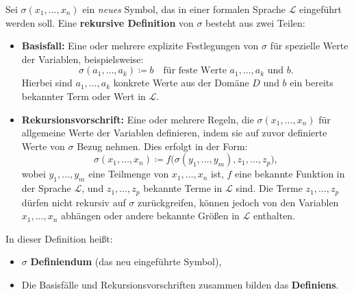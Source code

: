 \documentclass[main.tex]{subfiles}
\begin{document}
\begin{definition}
Sei \(\sigma(x_1, \ldots, x_n)\) ein \emph{neues} Symbol, das in einer formalen Sprache \(\mathcal{L}\) eingeführt werden soll. Eine \textbf{rekursive Definition} von \(\sigma\) besteht aus zwei Teilen:

\begin{itemize}
    \item \textbf{Basisfall:} Eine oder mehrere explizite Festlegungen von \(\sigma\) für spezielle Werte der Variablen, beispielsweise:
    \[
    \sigma(a_1, \ldots, a_k) \coloneqq b \quad \text{für feste Werte } a_1, \ldots, a_k \text{ und } b.
    \]
    Hierbei sind \(a_1, \ldots, a_k\) konkrete Werte aus der Domäne \(D\) und \(b\) ein bereits bekannter Term oder Wert in \(\mathcal{L}\).
    
    \item \textbf{Rekursionsvorschrift:} Eine oder mehrere Regeln, die \(\sigma(x_1, \ldots, x_n)\) für allgemeine Werte der Variablen definieren, indem sie auf zuvor definierte Werte von \(\sigma\) Bezug nehmen. Dies erfolgt in der Form:
    \[
    \sigma(x_1, \ldots, x_n) \coloneqq f\big(\sigma(y_1, \ldots, y_m), z_1, \ldots, z_p\big),
    \]
    wobei \(y_1, \ldots, y_m\) eine Teilmenge von \(x_1, \ldots, x_n\) ist, \(f\) eine bekannte Funktion in der Sprache \(\mathcal{L}\), und \(z_1, \ldots, z_p\) bekannte Terme in \(\mathcal{L}\) sind. Die Terme \(z_1, \ldots, z_p\) dürfen nicht rekursiv auf \(\sigma\) zurückgreifen, können jedoch von den Variablen \(x_1, \ldots, x_n\) abhängen oder andere bekannte Größen in \(\mathcal{L}\) enthalten.
\end{itemize}

In dieser Definition heißt:
\begin{itemize}
    \item \(\sigma\) \textbf{Definiendum} (das neu eingeführte Symbol),
    \item Die Basisfälle und Rekursionsvorschriften zusammen bilden das \textbf{Definiens}.
\end{itemize}

\noindent

\end{definition}
\end{document}
